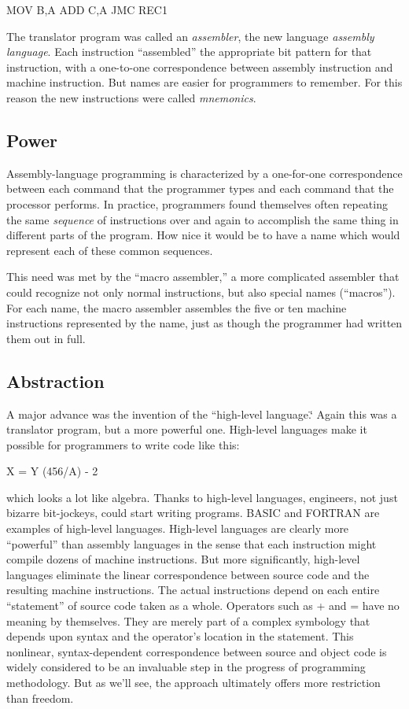 \begin{Code}
MOV B,A
ADD C,A
JMC REC1
\end{Code}
The translator program was called an \emph{assembler}, the new language
\emph{assembly language}. Each instruction {}``assembled'' the appropriate
bit pattern for that instruction, with a one-to-one correspondence
between assembly instruction and machine instruction. But names are
easier for programmers to remember. For this reason the new instructions
were called \emph{mnemonics}.


\subsection{Power}
Assembly-language programming is characterized by a one-for-one correspondence
between each command that the programmer types and each command that
the processor performs. In practice, programmers found themselves
often repeating the same \emph{sequence} of instructions over and
again to accomplish the same thing in different parts of the program.
How nice it would be to have a name which would represent each of
these common sequences.

This need was met by the {}``macro assembler,'' a more complicated
assembler that could recognize not only normal instructions, but also
special names ({}``macros''). For each name, the macro assembler
assembles the five or ten machine instructions represented by the
name, just as though the programmer had written them out in full.


\subsection{Abstraction}
A major advance was the invention of the {}``high-level language.\char`\"{}
Again this was a translator program, but a more powerful one. High-level
languages make it possible for programmers to write code like this:

\begin{Code}
X = Y (456/A) - 2
\end{Code}


which looks a lot like algebra. Thanks to high-level languages, engineers,
not just bizarre bit-jockeys, could start writing programs. BASIC
and FORTRAN are examples of high-level languages. High-level languages
are clearly more {}``powerful'' than assembly languages in the sense
that each instruction might compile dozens of machine instructions.
But more significantly, high-level languages eliminate the linear
correspondence between source code and the resulting machine instructions.
The actual instructions depend on each entire {}``statement'' of
source code taken as a whole. Operators such as + and = have no meaning
by themselves. They are merely part of a complex symbology that depends
upon syntax and the operator's location in the statement. This nonlinear,
syntax-dependent correspondence between source and object code is
widely considered to be an invaluable step in the progress of programming
methodology. But as we'll see, the approach ultimately offers more
restriction than freedom.



